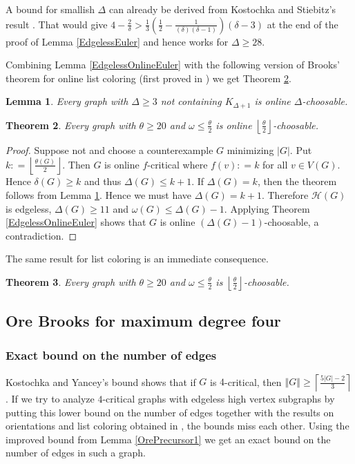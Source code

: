 \documentclass[12pt]{article}
\theoremstyle{plain}
\newtheorem{thm}{Theorem}[section]
\newtheorem{lem}[thm]{Lemma}
\theoremstyle{definition}
\theoremstyle{remark}
\newcommand{\fancy}[1]{\mathcal{#1}}
\newcommand{\HH}{\fancy{H}}
\newcommand{\card}[1]{\left|#1\right|}
\newcommand{\size}[1]{\left\Vert#1\right\Vert}
\newcommand{\ceil}[1]{\left\lceil#1\right\rceil}
\newcommand{\floor}[1]{\left\lfloor#1\right\rfloor}
\newcommand{\parens}[1]{\left( #1 \right)}
\newcommand{\DefinedAs}{\mathrel{\mathop:}=}
\begin{document}
A bound for smallish $\Delta$ can already be derived from Kostochka and Stiebitz's result \cite{kostochkastiebitzedgesincriticalgraph}.  That would give $4 - \frac{2}{\delta} > \frac13\parens{\frac12 - \frac{1}{(\delta)(\delta-1)}}\parens{\delta-3}$ at the end of the proof of Lemma \ref{EdgelessEuler} and hence works for $\Delta \geq 28$.

Combining Lemma \ref{EdgelessOnlineEuler} with the following version of Brooks' theorem for online list coloring (first proved in \cite{Hladky}) we get Theorem \ref{OurListOnlineOre}.

\begin{lem}\label{BrooksOnline}
Every graph with $\Delta \geq 3$ not containing $K_{\Delta+1}$ is online $\Delta$-choosable.
\end{lem}

\begin{thm}\label{OurListOnlineOre}
Every graph with $\theta \geq 20$ and $\omega \leq \frac{\theta}{2}$ is online $\floor{\frac{\theta}{2}}$-choosable.
\end{thm}
\begin{proof}
Suppose not and choose a counterexample $G$ minimizing $\card{G}$.  Put $k \DefinedAs \floor{\frac{\theta(G)}{2}}$. Then $G$ is online $f$-critical where $f(v) \DefinedAs k$ for all $v \in V(G)$.  Hence $\delta(G) \geq k$ and thus $\Delta(G) \leq k + 1$. If $\Delta(G) = k$, then the theorem follows from Lemma \ref{BrooksOnline}. Hence we must have $\Delta(G) = k + 1$. Therefore $\HH(G)$ is edgeless, $\Delta(G) \geq 11$ and $\omega(G) \leq \Delta(G) - 1$.  Applying Theorem \ref{EdgelessOnlineEuler} shows that $G$ is online $(\Delta(G)-1)$-choosable, a contradiction.
\end{proof}

The same result for list coloring is an immediate consequence.

\begin{thm}\label{OurListOre}
Every graph with $\theta \geq 20$ and $\omega \leq \frac{\theta}{2}$ is $\floor{\frac{\theta}{2}}$-choosable.
\end{thm}

\subsection{Ore Brooks for maximum degree four}
\subsubsection{Exact bound on the number of edges}
Kostochka and Yancey's bound \cite{kostochkayancey2012ore} shows that if $G$ is $4$-critical, then $\size{G} \geq \ceil{\frac{5\card{G}-2}{3}}$.  If we try to analyze $4$-critical graphs with edgeless high vertex subgraphs by putting this lower bound on the number of edges together with the results on orientations and list coloring obtained in \cite{kostochkayancey2012ore}, the bounds miss each other.  Using the improved bound from Lemma \ref{OrePrecursor1} we get an exact bound on the number of edges in such a graph.
\end{document}
